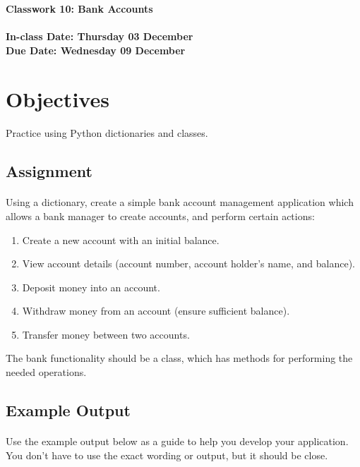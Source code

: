 \documentclass[letter,10pt]{article}
\begin{document}
    
    \huge
    \textbf{Classwork 10: Bank Accounts}
    \normalsize
    \\ ~~ \\
    \textbf{In-class Date: Thursday 03 December} \\
    \textbf{Due Date: Wednesday 09 December}
    
    \section*{Objectives}
    \paragraph{}Practice using Python dictionaries and classes.
    
    \subsection*{Assignment}
    \paragraph{}Using a dictionary, create a simple bank account management application which allows a bank manager to create accounts, and perform certain actions:
    \begin{enumerate}
        \item Create a new account with an initial balance.
        \item View account details (account number, account holder's name, and balance).
        \item Deposit money into an account.
        \item Withdraw money from an account (ensure sufficient balance).
        \item Transfer money between two accounts.
    \end{enumerate}
    
    The bank functionality should be a class, which has methods for performing the needed operations.
    
    \subsection*{Example Output}
    \paragraph{}Use the example output below as a guide to help you develop your application. You don't have to use the exact wording or output, but it should be close.
    
\end{document}
